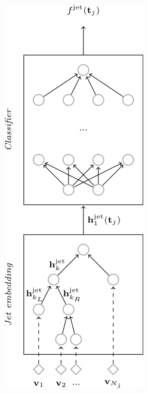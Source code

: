 \documentclass{beamer}
\begin{document}
\begin{frame}
\begin{columns}
\begin{column}{0.3\textwidth}
            \includegraphics[width=\textwidth]{figures/qcd-rnn.png}
        \end{column}
    \end{columns}
\end{frame}
\end{document}
